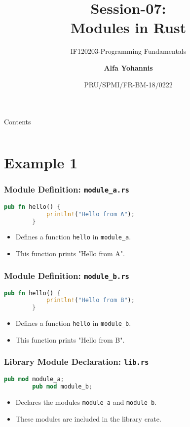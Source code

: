 \documentclass[aspectratio=169, table]{beamer}
\subtitle{IF120203-Programming Fundamentals}
\title{Session-07:\\\LARGE{Modules in Rust}\\ \vspace{10pt}}
\date[Serial]{\scriptsize {PRU/SPMI/FR-BM-18/0222}}
\author[Pradita]{\small{\textbf{Alfa Yohannis}}}
\begin{document}
\frame{\titlepage}

\begin{frame}{Contents}
	\vspace{15pt}
	\begin{columns}[t]
		\begin{column}{.5\textwidth}
			\tableofcontents[sections={1-12}]
		\end{column}
		\begin{column}{.5\textwidth}
			\tableofcontents[sections={13-24}]
		\end{column}
	\end{columns}
\end{frame}

	\section{Example 1}
	\begin{frame}[fragile]
	\frametitle{Module Definition: \texttt{module\_a.rs}}
	\begin{lstlisting}[language=Rust]
		pub fn hello() {
			println!("Hello from A"); 
		}
	\end{lstlisting}
	\begin{itemize}
		\item Defines a function \texttt{hello} in \texttt{module\_a}.
		\item This function prints "Hello from A".
	\end{itemize}
\end{frame}

\begin{frame}[fragile]
	\frametitle{Module Definition: \texttt{module\_b.rs}}
	\begin{lstlisting}[language=Rust]
		pub fn hello() {
			println!("Hello from B");
		}
	\end{lstlisting}
	\begin{itemize}
		\item Defines a function \texttt{hello} in \texttt{module\_b}.
		\item This function prints "Hello from B".
	\end{itemize}
\end{frame}

\begin{frame}[fragile]
	\frametitle{Library Module Declaration: \texttt{lib.rs}}
	\begin{lstlisting}[language=Rust]
		pub mod module_a; 
		pub mod module_b; 
	\end{lstlisting}
	\begin{itemize}
		\item Declares the modules \texttt{module\_a} and \texttt{module\_b}.
		\item These modules are included in the library crate.
	\end{itemize}
\end{frame}
\end{document}
